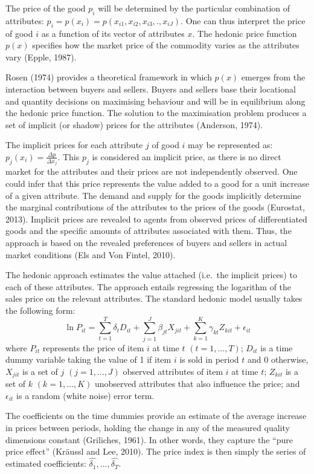 \documentclass[12pt,]{article}
\begin{document}
The price of the good \(p_i\) will be determined by the particular
combination of attributes:
\(p_i = p(x_i) = p(x_{i1}, x_{i2}, x_{i3}, ., x_{iJ})\). One can thus
interpret the price of good \(i\) as a function of its vector of
attributes \(x\). The hedonic price function \(p(x)\) specifies how the
market price of the commodity varies as the attributes vary (Epple,
1987).

Rosen (1974) provides a theoretical framework in which \(p(x)\) emerges
from the interaction between buyers and sellers. Buyers and sellers base
their locational and quantity decisions on maximising behaviour and will
be in equilibrium along the hedonic price function. The solution to the
maximisation problem produces a set of implicit (or shadow) prices for
the attributes (Anderson, 1974).

The implicit prices for each attribute \(j\) of good \(i\) may be
represented as: \(p_j (x_i) = \frac{\Delta p}{\Delta x_j}\). This
\(p_j\) is considered an implicit price, as there is no direct market
for the attributes and their prices are not independently observed. One
could infer that this price represents the value added to a good for a
unit increase of a given attribute. The demand and supply for the goods
implicitly determine the marginal contributions of the attributes to the
prices of the goods (Eurostat, 2013). Implicit prices are revealed to
agents from observed prices of differentiated goods and the specific
amounts of attributes associated with them. Thus, the approach is based
on the revealed preferences of buyers and sellers in actual market
conditions (Els and Von Fintel, 2010).

The hedonic approach estimates the value attached (i.e.~the implicit
prices) to each of these attributes. The approach entails regressing the
logarithm of the sales price on the relevant attributes. The standard
hedonic model usually takes the following form:
\[\ln P_{it} = \sum_{t=1}^T \delta_t D_{it} + \sum_{j=1}^J \beta_{jt} X_{jit} + \sum_{k=1}^K \gamma_{kt} Z_{kit} + \epsilon_{it}\]
where \(P_{it}\) represents the price of item \(i\) at time \(t\)
\((t=1, ..., T)\); \(D_{it}\) is a time dummy variable taking the value
of 1 if item \(i\) is sold in period \(t\) and 0 otherwise, \(X_{jit}\)
is a set of \(j\) \((j=1, ..., J)\) observed attributes of item \(i\) at
time \(t\); \(Z_{kit}\) is a set of \(k\) \((k=1, ..., K)\) unobserved
attributes that also influence the price; and \(\epsilon_{it}\) is a
random (white noise) error term.

The coefficients on the time dummies provide an estimate of the average
increase in prices between periods, holding the change in any of the
measured quality dimensions constant (Griliches, 1961). In other words,
they capture the ``pure price effect'' (Kräussl and Lee, 2010). The
price index is then simply the series of estimated coefficients:
\(\hat{\delta_1}, ..., \hat{\delta_T}\).
\end{document}
